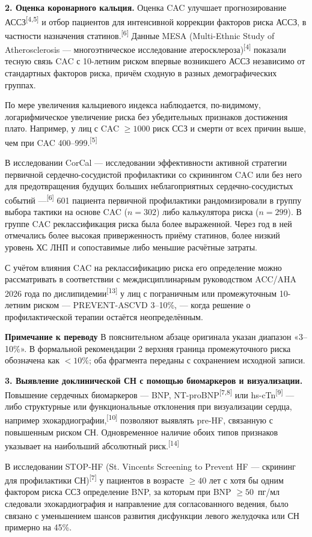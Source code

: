 \documentclass[11pt,a4paper]{article}
\newcommand{\src}[1]{\textsuperscript{[#1]}}
\newcommand{\editorial}[1]{\par\begingroup\small\color{black!70}\textbf{Примечание к переводу} #1\par\endgroup}
\begin{document}
\textbf{2. Оценка коронарного кальция.} Оценка CAC улучшает прогнозирование АССЗ\src{4,5} и отбор пациентов для интенсивной коррекции факторов риска АССЗ, в частности назначения статинов.\src{6} Данные MESA (Multi-Ethnic Study of Atherosclerosis --- многоэтническое исследование атеросклероза)\src{4} показали тесную связь CAC с 10-летним риском впервые возникшего АССЗ независимо от стандартных факторов риска, причём сходную в разных демографических группах.

По мере увеличения кальциевого индекса наблюдается, по-видимому, логарифмическое увеличение риска без убедительных признаков достижения плато. Например, у лиц с CAC $\geq1000$ риск ССЗ и смерти от всех причин выше, чем при CAC 400--999.\src{5}

В исследовании CorCal --- исследовании эффективности активной стратегии первичной сердечно-сосудистой профилактики со скринингом CAC или без него для предотвращения будущих больших неблагоприятных сердечно-сосудистых событий ---\src{6} 601 пациента первичной профилактики рандомизировали в группу выбора тактики на основе CAC ($n=302$) либо калькулятора риска ($n=299$). В группе CAC реклассификация риска была более выраженной. Через год в ней отмечались более высокая приверженность приёму статинов, более низкий уровень ХС ЛНП и сопоставимые либо меньшие расчётные затраты.

С учётом влияния CAC на реклассификацию риска его определение можно рассматривать в соответствии с междисциплинарным руководством ACC/AHA 2026 года по дислипидемии\src{13} у лиц с пограничным или промежуточным 10-летним риском --- PREVENT-ASCVD 3--10\%, --- когда решение о профилактической терапии остаётся неопределённым.

\editorial{В пояснительном абзаце оригинала указан диапазон «3--10\%». В формальной рекомендации 2 верхняя граница промежуточного риска обозначена как $<10\%$; оба фрагмента переданы с сохранением исходной записи.}

\textbf{3. Выявление доклинической СН с помощью биомаркеров и визуализации.} Повышение сердечных биомаркеров --- BNP, NT-proBNP\src{7,8} или hs-cTn\src{9} --- либо структурные или функциональные отклонения при визуализации сердца, например эхокардиографии,\src{10} позволяют выявлять pre-HF, связанную с повышенным риском СН. Одновременное наличие обоих типов признаков указывает на наибольший абсолютный риск.\src{14}

В исследовании STOP-HF (St. Vincents Screening to Prevent HF --- скрининг для профилактики СН)\src{7} у пациентов в возрасте $\geq40$ лет с хотя бы одним фактором риска ССЗ определение BNP, за которым при BNP $\geq50$~пг/мл следовали эхокардиография и направление для согласованного ведения, было связано с уменьшением шансов развития дисфункции левого желудочка или СН примерно на 45\%.
\end{document}
